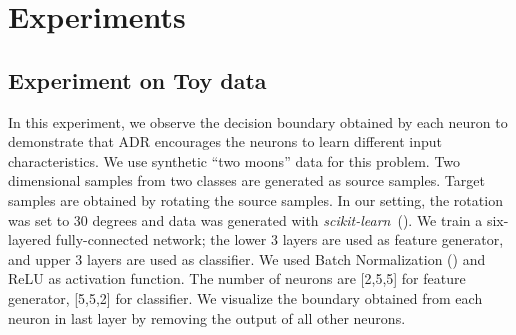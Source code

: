 \documentclass{article} \usepackage{iclr2018_conference,times}
\begin{document}
\section{Experiments}
\subsection{Experiment on Toy data}\label{sec:toy}
\vspace{-3mm}        
 In this experiment, we observe the decision boundary obtained by each neuron to demonstrate that ADR encourages the neurons to learn different input characteristics.
We use synthetic ``two moons'' data for this problem. Two dimensional samples from two classes are generated as source samples. Target samples are obtained by rotating the source samples. In our setting, the rotation was set to 30 degrees and data was generated with {\it scikit-learn}~(\cite{pedregosa2011scikit}). 
We train a six-layered fully-connected network; the lower 3 layers are used as feature generator, and upper 3 layers are used as classifier. We used Batch Normalization (\cite{ioffe2015batch}) and ReLU as activation function. The number of neurons are [2,5,5] for feature generator, [5,5,2] for classifier. We visualize the boundary obtained from each neuron in last layer by removing the output of all other neurons. 
\end{document}
